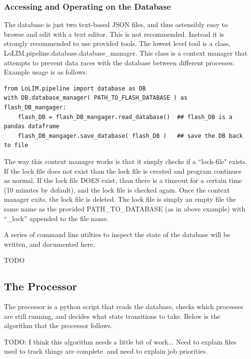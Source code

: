 \documentclass[]{article}
\begin{document}
\subsubsection{Accessing and Operating on the Database}

The database is just two text-based JSON files, and thus ostensibly easy to browse and edit with a text editor. This is not recommended. Instead it is strongly recommended to use provided tools. The lowest level tool is a class, LoLIM.pipeline.database.database\_manager. This class is a context manager that attempts to prevent data races with the database between different processes. Example usage is as follows:
\begin{verbatim}
from LoLIM.pipeline import database as DB
with DB.database_manager( PATH_TO_FLASH_DATABASE ) as flash_DB_mangager:
    flash_DB = flash_DB_mangager.read_database()  ## flash_DB is a pandas dataframe
    flash_DB_mangager.save_database( flash_DB )   ## save the DB back to file
\end{verbatim}
The way this context manager works is that it simply checks if a ``lock-file" exists. If the lock file does not exist than the lock file is created and program continues as normal. If the lock file DOES exist, than there is a timeout for a certain time (10 minutes by default), and the lock file is checked again. Once the context manager exits, the lock file is deleted. The lock file is simply an empty file the same name as the provided PATH\_TO\_DATABASE (as in above example) with ``\_lock'' appended to the file name.

A series of command line utilties to inspect the state of the database will be written, and documented here. 

TODO

\subsection{The Processor}

The processor is a python script that reads the database, checks which processes are still running, and decides what state transitions to take. Below is the algorithm that the processor follows.

TODO: I think this algorithm needs a little bit of work...  Need to explain files used to track things are complete. and need to explain job priorities. 
\end{document}

